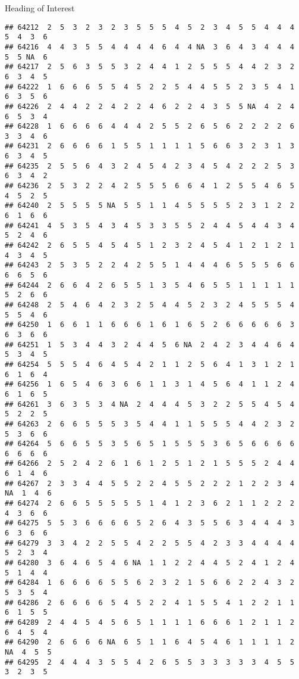 \documentclass[
  ignorenonframetext,
]{beamer}
\begin{document}
\begin{frame}[fragile]{Heading of Interest}
\begin{verbatim}
## 64212  2  5  3  2  3  2  3  5  5  5  4  5  2  3  4  5  5  4  4  4  5  4  3  6
## 64216  4  4  3  5  5  4  4  4  4  6  4  4 NA  3  6  4  3  4  4  4  5  5 NA  6
## 64217  2  5  6  3  5  5  3  2  4  4  1  2  5  5  5  4  4  2  3  2  6  3  4  5
## 64222  1  6  6  6  5  5  4  5  2  2  5  4  4  5  5  2  3  5  4  1  6  3  5  6
## 64226  2  4  4  2  2  4  2  2  4  6  2  2  4  3  5  5 NA  4  2  4  6  5  3  4
## 64228  1  6  6  6  6  4  4  4  2  5  5  2  6  5  6  2  2  2  2  6  3  3  4  6
## 64231  2  6  6  6  6  1  5  5  1  1  1  1  5  6  6  3  2  3  1  3  6  3  4  5
## 64235  2  5  5  6  4  3  2  4  5  4  2  3  4  5  4  2  2  2  5  3  6  3  4  2
## 64236  2  5  3  2  2  4  2  5  5  5  6  6  4  1  2  5  5  4  6  5  4  5  2  5
## 64240  2  5  5  5  5 NA  5  5  1  1  4  5  5  5  5  2  3  1  2  2  6  1  6  6
## 64241  4  5  3  5  4  3  4  5  3  3  5  5  2  4  4  5  4  4  3  4  5  2  4  6
## 64242  2  6  5  5  4  5  4  5  1  2  3  2  4  5  4  1  2  1  2  1  4  3  4  5
## 64243  2  5  3  5  2  2  4  2  5  5  1  4  4  4  6  5  5  5  6  6  6  6  5  6
## 64244  2  6  6  4  2  6  5  5  1  3  5  4  6  5  5  1  1  1  1  1  5  2  6  6
## 64248  2  5  4  6  4  2  3  2  5  4  4  5  2  3  2  4  5  5  5  4  5  5  4  6
## 64250  1  6  6  1  1  6  6  6  1  6  1  6  5  2  6  6  6  6  6  3  6  3  6  6
## 64251  1  5  3  4  4  3  2  4  4  5  6 NA  2  4  2  3  4  4  6  4  5  3  4  5
## 64254  5  5  5  4  6  4  5  4  2  1  1  2  5  6  4  1  3  1  2  1  6  1  6  4
## 64256  1  6  5  4  6  3  6  6  1  1  3  1  4  5  6  4  1  1  2  4  6  1  6  5
## 64261  3  6  3  5  3  4 NA  2  4  4  4  5  3  2  2  5  5  4  5  4  5  2  2  5
## 64263  2  6  6  5  5  5  3  5  4  4  1  1  5  5  5  4  4  2  3  2  5  3  6  6
## 64264  5  6  6  5  5  3  5  6  5  1  5  5  5  3  6  5  6  6  6  6  6  6  6  6
## 64266  2  5  2  4  2  6  1  6  1  2  5  1  2  1  5  5  5  2  4  4  6  1  4  6
## 64267  2  3  3  4  4  5  5  2  2  4  5  5  2  2  2  1  2  2  3  4 NA  1  4  6
## 64274  2  6  6  5  5  5  5  5  1  4  1  2  3  6  2  1  1  2  2  2  4  3  6  6
## 64275  5  5  3  6  6  6  6  5  2  6  4  3  5  5  6  3  4  4  4  3  6  3  6  6
## 64279  3  3  4  2  2  5  5  4  2  2  5  5  4  2  3  3  4  4  4  4  5  2  3  4
## 64280  3  6  4  6  5  4  6 NA  1  1  2  2  4  4  5  2  4  1  2  4  5  1  4  4
## 64284  1  6  6  6  6  5  5  6  2  3  2  1  5  6  6  2  2  4  3  2  5  3  5  4
## 64286  2  6  6  6  6  5  4  5  2  2  4  1  5  5  4  1  2  2  1  1  6  1  5  5
## 64289  2  4  4  5  4  5  6  5  1  1  1  1  6  6  6  1  2  1  1  2  6  4  5  4
## 64290  2  6  6  6  6 NA  6  5  1  1  6  4  5  4  6  1  1  1  1  2 NA  4  5  5
## 64295  2  4  4  4  3  5  5  4  2  6  5  5  3  3  3  3  3  4  5  5  3  2  3  5

\end{verbatim}
\end{frame}
\end{document}
